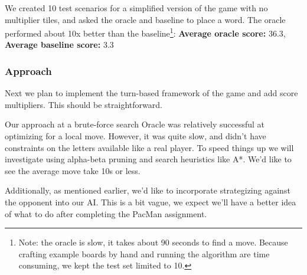 \documentclass[12pt]{article}
\begin{document}
\begin{footnotesize}
We created 10 test scenarios for a simplified version of the game with no multiplier tiles, and asked the oracle and baseline to place a word. The oracle performed about 10x better than the baseline\footnote{Note: the oracle is slow, it takes about 90 seconds to find a move. Because crafting example boards by hand and running the algorithm are time consuming, we kept the test set limited to 10.}: \textbf{Average oracle score:} 36.3, \textbf{Average baseline score:} 3.3



\subsubsection*{Approach}
Next we plan to implement the turn-based framework of the game and add
score multipliers. This should be straightforward.

Our approach at a brute-force search Oracle was relatively successful
at optimizing for a local move. However, it was quite slow, and didn't
have constraints on the letters available like a real player. To speed
things up we will investigate using alpha-beta pruning and search
heuristics like A*. We'd like to see the average move take 10s or
less.

Additionally, as mentioned earlier, we'd like to incorporate
strategizing against the opponent into our AI. This is a bit vague, we
expect we'll have a better idea of what to do after completing the
PacMan assignment.



\end{footnotesize}
\end{document}
